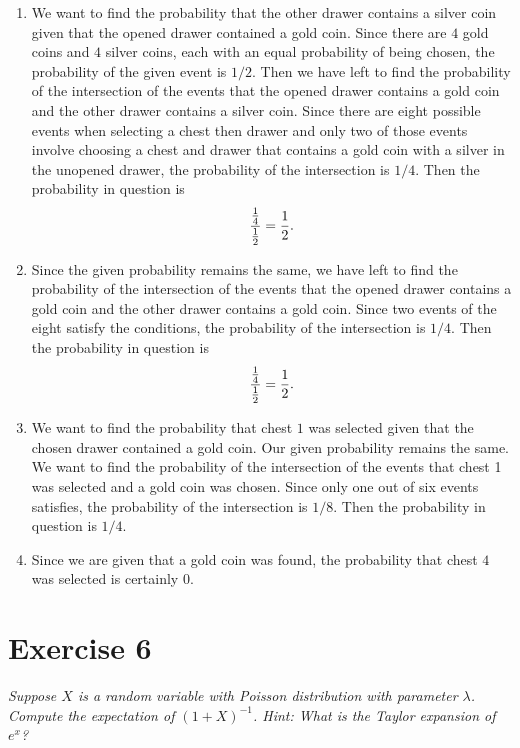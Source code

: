 \documentclass{abrice}
\begin{document}
\begin{enumerate}[label=(\alph*)]
\item We want to find the probability that the other drawer contains a
  silver coin given that the opened drawer contained a gold
  coin. Since there are $4$ gold coins and $4$ silver coins, each with
  an equal probability of being chosen, the probability of the given
  event is $1/2$. Then we have left to find the probability of the
  intersection of the events that the opened drawer contains a gold
  coin and the other drawer contains a silver coin. Since there are
  eight possible events when selecting a chest then drawer and only two
  of those events involve choosing a chest and drawer that contains a
  gold coin with a silver in the unopened drawer, the probability of
  the intersection is $1/4$. Then the probability in question is
  \[
  { {1 \over 4} \over {1 \over 2}} = {1 \over 2}.
  \]

\item Since the given probability remains the same, we have left to
  find the probability of the intersection of the events that the
  opened drawer contains a gold coin and the other drawer contains a
  gold coin. Since two events of the eight satisfy the conditions, the
  probability of the intersection is $1/4$. Then the probability in
  question is
  \[
  { {1 \over 4} \over {1 \over 2} } = {1 \over 2}.
  \]

\item We want to find the probability that chest $1$ was selected
  given that the chosen drawer contained a gold coin. Our given
  probability remains the same. We want to find the probability of the
  intersection of the events that chest 1 was selected and a gold coin
  was chosen. Since only one out of six events satisfies, the
  probability of the intersection is $1/8$. Then the probability in
  question is $1/4$.

\item Since we are given that a gold coin was found, the probability
  that chest $4$ was selected is certainly $0$.
\end{enumerate}

\section{Exercise 6}

\emph{Suppose $X$ is a random variable with Poisson distribution with
  parameter $\lambda$. Compute the expectation of ${(1 +
  X)}^{-1}$. Hint: What is the Taylor expansion of $e^x$?
}
\end{document}
